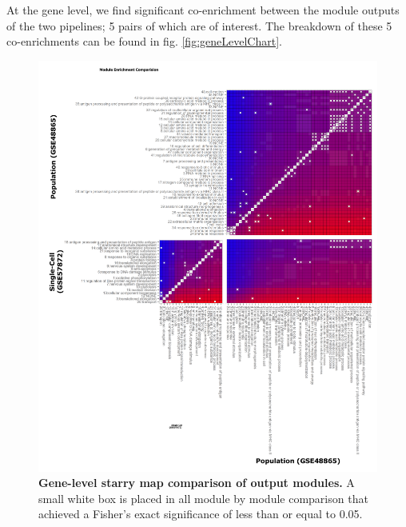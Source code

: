 \documentclass[10pt,letterpaper]{article}
\begin{document}
At the gene level, we find significant co-enrichment between the module outputs of the two pipelines; 5 pairs of which are of interest. The breakdown of these 5 co-enrichments can be found in fig. \ref{fig:geneLevelChart}.

\begin{figure}[h]
\centering
\includegraphics[width=120mm]{Figures/moduleCompareStaryMap}
\caption{\textbf{Gene-level starry map comparison of output modules.} A small white box is placed in all module by module comparison that achieved a Fisher's exact significance of less than or equal to 0.05.}
\label{fig:starryMap2}
\end{figure}
\end{document}

